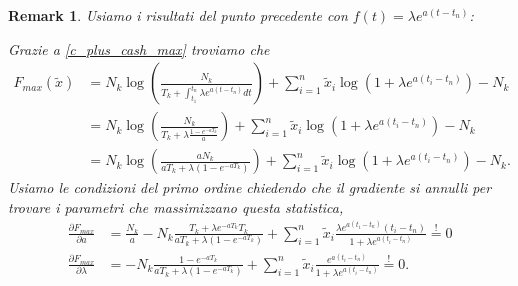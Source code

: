\documentclass[10pt,a4paper]{report}
\newtheorem{remark}{Remark}
\begin{document}
\begin{remark}
Usiamo i risultati del punto precedente con $f(t)=\lambda e^{a(t-t_n)}$:

Grazie a \eqref{c_plus_cash_max} troviamo che
\begin{align*}
F_{max}(\tilde{x}) &= N_k\log\left(\frac{N_k}{T_k+\int_{t_1}^{t_n}\lambda e^{a(t-t_n)}dt}\right) + \sum_{i=1}^n\tilde{x}_i\log(1+\lambda e^{a(t_i-t_n)}) -N_k\\
&= N_k\log\left(\frac{N_k}{T_k+\lambda \frac{1-e^{-aT_k}}{a}}\right) + \sum_{i=1}^n\tilde{x}_i\log(1+\lambda e^{a(t_i-t_n)}) -N_k\\
&= N_k\log\left(\frac{aN_k}{aT_k+\lambda \left(1-e^{-aT_k}\right)}\right) + \sum_{i=1}^n\tilde{x}_i\log(1+\lambda e^{a(t_i-t_n)}) -N_k.
\end{align*}
Usiamo le condizioni del primo ordine chiedendo che il gradiente si annulli per trovare i parametri che massimizzano questa statistica,
\begin{align*}
\frac{\partial F_{max}}{\partial a} &= \frac{N_k}{a}-N_k\frac{T_k+\lambda e^{-aT_k}T_k}{aT_k+\lambda \left(1-e^{-aT_k}\right)}+\sum_{i=1}^n\tilde{x}_i\frac{\lambda e^{a(t_i-t_n)}(t_i-t_n)}{1+\lambda e^{a(t_i-t_n)}}\stackrel{!}{=}0\\
\frac{\partial F_{max}}{\partial \lambda} &= -N_k\frac{1-e^{-aT_k}}{aT_k+\lambda \left(1-e^{-aT_k}\right)}+\sum_{i=1}^n\tilde{x}_i\frac{e^{a(t_i-t_n)}}{1+\lambda e^{a(t_i-t_n)}}\stackrel{!}{=}0.
\end{align*}
\end{remark}
\end{document}
